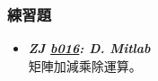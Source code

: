 \subsubsection*{練習題}
\begin{itemize}[label={\Checkmark}]
\item \textbf{\textit{ZJ \href{http://zerojudge.tw/ShowProblem?problemid=b016}{b016}: D. Mitlab}}\\
矩陣加減乘除運算。
\end{itemize}